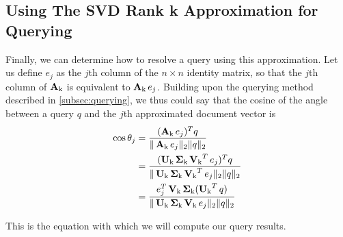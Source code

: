 \subsection{Using The SVD Rank k Approximation for Querying}
Finally, we can determine how to resolve a query using this approximation.
Let us define $e_j$ as the $j$th column of the $n \times n$ identity matrix, so that the $j$th column of
$\operatorname{\mathbf{A}_k}$ is equivalent to $\operatorname{\mathbf{A}_k} e_j$. Building upon the querying method described in \autoref{subsec:querying}, we thus could 
say that the cosine of the angle between a query $q$ and the $j$th approximated document vector is
\begin{equation}\label{eq:rankCos}
\begin{aligned}
    \cos\theta_j  &= \frac{(\operatorname{\mathbf{A}_k} e_j)^Tq}{\|\operatorname{\mathbf{A}_k} e_j\|_2 \|q\|_2 } \\
                &= \frac{(\operatorname{\mathbf{U}_k}\operatorname{\mathbf{\Sigma}_k}\operatorname{\mathbf{V}_k}^T e_j)^Tq}{\|\operatorname{\mathbf{U}_k}\operatorname{\mathbf{\Sigma}_k}\operatorname{\mathbf{V}_k}^T e_j\|_2 \|q\|_2 } \\
                &= \frac{e_j^T\operatorname{\mathbf{V}_k}\operatorname{\mathbf{\Sigma}_k} (\operatorname{\mathbf{U}_k}^Tq)}{\|\operatorname{\mathbf{U}_k}\operatorname{\mathbf{\Sigma}_k}\operatorname{\mathbf{V}_k} e_j\|_2 \|q\|_2 }        
\end{aligned}
\end{equation}

This is the equation with which we will compute our query results. 





 